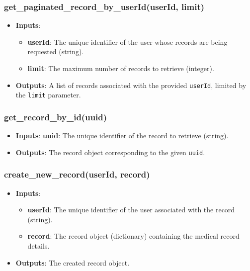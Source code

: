 \documentclass[12pt, titlepage]{article}
\begin{document}
\subsubsection{get\_paginated\_record\_by\_userId(userId, limit)}
\begin{itemize}
    \item \textbf{Inputs}:
        \begin{itemize}
            \item \textbf{userId}: The unique identifier of the user whose records are being requested (string).
            \item \textbf{limit}: The maximum number of records to retrieve (integer).
        \end{itemize}
    \item \textbf{Outputs}: A list of records associated with the provided \texttt{userId}, limited by the \texttt{limit} parameter.
\end{itemize}

\subsubsection{get\_record\_by\_id(uuid)}
\begin{itemize}
    \item \textbf{Inputs}: \textbf{uuid}: The unique identifier of the record to retrieve (string).
    \item \textbf{Outputs}: The record object corresponding to the given \texttt{uuid}.
\end{itemize}

\subsubsection{create\_new\_record(userId, record)}
\begin{itemize}
    \item \textbf{Inputs}:
        \begin{itemize}
            \item \textbf{userId}: The unique identifier of the user associated with the record (string).
            \item \textbf{record}: The record object (dictionary) containing the medical record details.
        \end{itemize}
    \item \textbf{Outputs}: The created record object.
\end{itemize}
\end{document}

